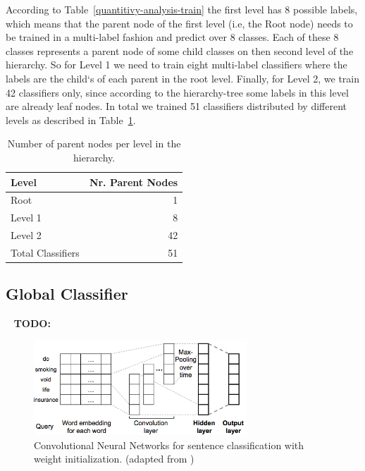 \documentclass[11pt,a4paper]{article}
\begin{document}
According to Table~\ref{quantitivy-analysis-train} the first level has 8 possible
labels, which means that the parent node of the first level (i.e, the Root node)
needs to be trained in a multi-label fashion and predict over 8 classes. Each of
these 8 classes represents a parent node of some child classes on then
second level of the hierarchy. So for Level 1 we need to train eight multi-label
classifiers where the labels are the child`s of each parent in the root level.
Finally, for Level 2, we train 42 classifiers only, since according to the
hierarchy-tree some labels in this level are already leaf nodes. In total we
trained 51 classifiers distributed by different levels as described in
Table~\ref{parent-per-node-classifiers}.

\begin{table}[!h]
\begin{center}
\begin{tabular}{|l|r|}
\hline\centering\textbf{Level}  &  \textbf{Nr. Parent Nodes}    \\
\hline
Root              &  1       \\
Level 1           &  8       \\
Level 2           &  42      \\
\hline
Total Classifiers & 51       \\
\hline
\end{tabular}
\end{center}
\caption{\label{parent-per-node-classifiers}Number of parent nodes per level in the hierarchy.}
\end{table}

\subsection{Global Classifier}



\ \newline
\textbf{TODO:}
\ \newline


\begin{figure}[h]
\centering
    \includegraphics[width=8cm]{global_classifier_nn.png}
    \caption{Convolutional Neural Networks for sentence classification with weight initialization. (adapted from )}
    \label{fig:mesh1}
\end{figure}
\end{document}
